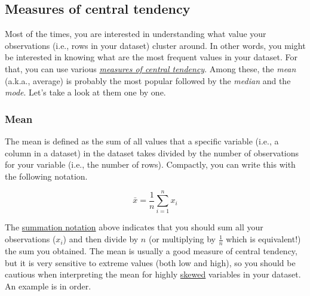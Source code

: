 \documentclass[
  letterpaper,
  DIV=11,
  numbers=noendperiod]{scrartcl}
\begin{document}
\subsection{Measures of central
tendency}\label{measures-of-central-tendency}

Most of the times, you are interested in understanding what value your
observations (i.e., rows in your dataset) cluster around. In other
words, you might be interested in knowing what are the most frequent
values in your dataset. For that, you can use various
\href{https://www.abs.gov.au/statistics/understanding-statistics/statistical-terms-and-concepts/measures-central-tendency\#:~:text=There\%20are\%20three\%20main\%20measures,mean}{\emph{measures
of central tendency}}. Among these, the \emph{mean} (a.k.a., average) is
probably the most popular followed by the \emph{median} and the
\emph{mode}. Let's take a look at them one by one.

\subsubsection{Mean}\label{mean}

The mean is defined as the sum of all values that a specific variable
(i.e., a column in a dataset) in the dataset takes divided by the number
of observations for your variable (i.e., the number of rows). Compactly,
you can write this with the following notation.

\[
\bar{x} = \frac{1}{n} \sum_{i=1}^n x_i
\]

The
\href{https://www.columbia.edu/itc/sipa/math/summation.html}{summation
notation} above indicates that you should sum all your observations
(\(x_i\)) and then divide by \(n\) (or multiplying by \(\frac{1}{n}\)
which is equivalent!) the sum you obtained. The mean is usually a good
measure of central tendency, but it is very sensitive to extreme values
(both low and high), so you should be cautious when interpreting the
mean for highly
\href{https://www.scribbr.com/statistics/skewness/}{skewed} variables in
your dataset. An example is in order.
\end{document}
